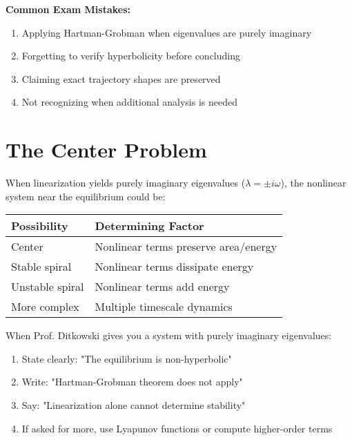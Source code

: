 \documentclass[12pt]{article}
\begin{document}
\begin{warning}
\textbf{Common Exam Mistakes:}
\begin{enumerate}
    \item Applying Hartman-Grobman when eigenvalues are purely imaginary
    \item Forgetting to verify hyperbolicity before concluding
    \item Claiming exact trajectory shapes are preserved
    \item Not recognizing when additional analysis is needed
\end{enumerate}
\end{warning}

\section{The Center Problem}

When linearization yields purely imaginary eigenvalues ($\lambda = \pm i\omega$), the nonlinear system near the equilibrium could be:

\begin{center}
\begin{tabular}{|l|l|}
\hline
\textbf{Possibility} & \textbf{Determining Factor} \\
\hline
Center & Nonlinear terms preserve area/energy \\
Stable spiral & Nonlinear terms dissipate energy \\
Unstable spiral & Nonlinear terms add energy \\
More complex & Multiple timescale dynamics \\
\hline
\end{tabular}
\end{center}

\begin{examtip}
When Prof. Ditkowski gives you a system with purely imaginary eigenvalues:
\begin{enumerate}
    \item State clearly: "The equilibrium is non-hyperbolic"
    \item Write: "Hartman-Grobman theorem does not apply"
    \item Say: "Linearization alone cannot determine stability"
    \item If asked for more, use Lyapunov functions or compute higher-order terms
\end{enumerate}
\end{examtip}
\end{document}
